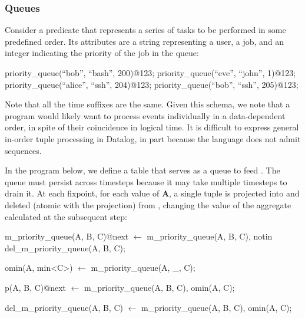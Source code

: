 

\subsubsection{Queues}

Consider a predicate  that represents a series of tasks to be performed in some predefined order.  Its attributes are a string representing a user, a job, and an integer
indicating the priority of the job in the queue:

\begin{Dedalus}
priority\_queue(``bob'', ``bash'', 200)@123;
priority\_queue(``eve'', ``john'', 1)@123;
priority\_queue(``alice'', ``ssh'', 204)@123;
priority\_queue(``bob'', ``ssh'', 205)@123;
\end{Dedalus}

Note that all the time suffixes are the same.  
Given this schema, we note that a program would likely want to process
 events individually in a data-dependent order, in
spite of their coincidence in logical time.  It is difficult to express general
in-order tuple processing in Datalog, in part because the language does not
admit sequences.

In the program below, we define a table  that
serves as a queue to feed .  The queue must persist
across timesteps because it may take multiple timesteps to drain it.  At each
fixpoint, for each value of \textbf{A}, a single tuple is projected into
 and deleted (atomic with the projection) from
, changing the value of the aggregate calculated
at the subsequent step:

\begin{Dedalus}

m\_priority\_queue(A, B, C)@next \(\leftarrow\)
  m\_priority\_queue(A, B, C),
  notin del\_m\_priority\_queue(A, B, C);

omin(A, min<C>) \(\leftarrow\)
  m\_priority\_queue(A, _, C);

p(A, B, C)@next \(\leftarrow\)
  m\_priority\_queue(A, B, C),
  omin(A, C);

del\_m\_priority\_queue(A, B, C) \(\leftarrow\)
  m\_priority\_queue(A, B, C),
  omin(A, C);
\end{Dedalus}

